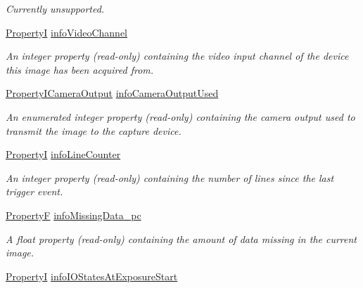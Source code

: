 \begin{DoxyCompactItemize}
\begin{DoxyCompactList}\small\item\em Currently unsupported. \end{DoxyCompactList}\item 
\hyperlink{group___common_interface_ga12d5e434238ca242a1ba4c6c3ea45780}{Property\+I} \hyperlink{classmv_i_m_p_a_c_t_1_1acquire_1_1_request_a18a833becdf1c41fa70dac4824d5ea01}{info\+Video\+Channel}
\begin{DoxyCompactList}\small\item\em An integer property {\bfseries }(read-\/only) containing the video input channel of the device this image has been acquired from. \end{DoxyCompactList}\item 
\hyperlink{group___common_interface_ga48585b26ebc31ccee54f34c7d6bbdda3}{Property\+I\+Camera\+Output} \hyperlink{classmv_i_m_p_a_c_t_1_1acquire_1_1_request_a531770aef701671337f6a75f6d08aa09}{info\+Camera\+Output\+Used}
\begin{DoxyCompactList}\small\item\em An enumerated integer property {\bfseries }(read-\/only) containing the camera output used to transmit the image to the capture device. \end{DoxyCompactList}\item 
\hyperlink{group___common_interface_ga12d5e434238ca242a1ba4c6c3ea45780}{Property\+I} \hyperlink{classmv_i_m_p_a_c_t_1_1acquire_1_1_request_a22b3b014b6d006099e6bd2db72ca65fe}{info\+Line\+Counter}
\begin{DoxyCompactList}\small\item\em An integer property {\bfseries }(read-\/only) containing the number of lines since the last trigger event. \end{DoxyCompactList}\item 
\hyperlink{group___common_interface_gaf54865fe5a3d5cfd15f9a111b40d09f9}{Property\+F} \hyperlink{classmv_i_m_p_a_c_t_1_1acquire_1_1_request_a91a5b9cb9445b7730686c02036c47274}{info\+Missing\+Data\+\_\+pc}
\begin{DoxyCompactList}\small\item\em A float property {\bfseries }(read-\/only) containing the amount of data missing in the current image. \end{DoxyCompactList}\item 
\hyperlink{group___common_interface_ga12d5e434238ca242a1ba4c6c3ea45780}{Property\+I} \hyperlink{classmv_i_m_p_a_c_t_1_1acquire_1_1_request_a510ba758567a030145090f020fa9a732}{info\+I\+O\+States\+At\+Exposure\+Start}

\end{DoxyCompactItemize}
